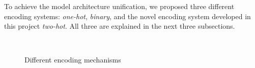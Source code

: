 To achieve the model architecture unification, we proposed three different encoding systems: \textit{one-hot}, \textit{binary}, and the novel encoding system developed in this project \textit{two-hot}. All three are explained in the next three subsections.

\begin{figure*}[!t]
 \centering
 
 \caption{Different encoding mechanisms%
 }~\label{Fig:One_binary_Encoding}
\end{figure*}



